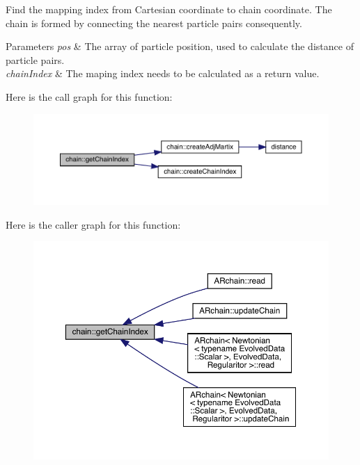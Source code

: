 Find the mapping index from Cartesian coordinate to chain coordinate. The chain is formed by connecting the nearest particle pairs consequently. 
\begin{DoxyParams}{Parameters}
{\em pos} & The array of particle position, used to calculate the distance of particle pairs. \\
\hline
{\em chain\+Index} & The maping index needs to be calculated as a return value. \\
\hline
\end{DoxyParams}
Here is the call graph for this function\+:
\nopagebreak
\begin{figure}[H]
\begin{center}
\leavevmode
\includegraphics[width=350pt]{namespacechain_a3e7b0a001442f121ce1408e7c9d12016_cgraph}
\end{center}
\end{figure}
Here is the caller graph for this function\+:
\nopagebreak
\begin{figure}[H]
\begin{center}
\leavevmode
\includegraphics[width=350pt]{namespacechain_a3e7b0a001442f121ce1408e7c9d12016_icgraph}
\end{center}
\end{figure}
\mbox{\label{namespacechain_a874f28a6248b56c6b2b3ca45c1bbea09}} 
